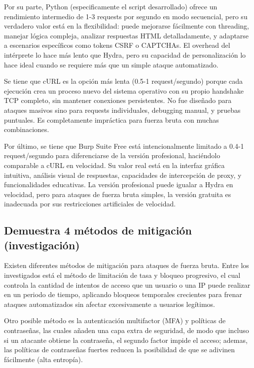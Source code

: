 \documentclass[letter,12pt]{article}
\begin{document}
Por su parte, Python (especificamente el script desarrollado) ofrece un rendimiento intermedio de 1-3 requests por segundo en modo secuencial, pero su verdadero valor está en la flexibilidad: puede mejorarse fácilmente con threading, manejar lógica compleja, analizar respuestas HTML detalladamente, y adaptarse a escenarios específicos como tokens CSRF o CAPTCHAs. El overhead del intérprete lo hace más lento que Hydra, pero su capacidad de personalización lo hace ideal cuando se requiere más que un simple ataque automatizado.

Se tiene que cURL es la opción más lenta (0.5-1 request/segundo) porque cada ejecución crea un proceso nuevo del sistema operativo con su propio handshake TCP completo, sin mantener conexiones persistentes. No fue diseñado para ataques masivos sino para requests individuales, debugging manual, y pruebas puntuales. Es completamente impráctica para fuerza bruta con muchas combinaciones.

Por último, se tiene que Burp Suite Free está intencionalmente limitado a 0.4-1 request/segundo para diferenciarse de la versión profesional, haciéndolo comparable a cURL en velocidad. Su valor real está en la interfaz gráfica intuitiva, análisis visual de respuestas, capacidades de intercepción de proxy, y funcionalidades educativas. La versión profesional puede igualar a Hydra en velocidad, pero para ataques de fuerza bruta simples, la versión gratuita es inadecuada por sus restricciones artificiales de velocidad.

\newpage

\subsection{Demuestra 4 métodos de mitigación (investigación)}
Existen diferentes métodos de mitigación para ataques de fuerza bruta. Entre los investigados está el método de limitación de tasa y bloqueo progresivo, el cual controla la cantidad de intentos de acceso que un usuario o una IP puede realizar en un periodo de tiempo, aplicando bloqueos temporales crecientes para frenar ataques automatizados sin afectar excesivamente a usuarios legítimos. 

Otro posible método es la autenticación multifactor (MFA) y políticas de contraseñas, las cuales añaden una capa extra de seguridad, de modo que incluso si un atacante obtiene la contraseña, el segundo factor impide el acceso; ademas, las políticas de contraseñas fuertes reducen la posibilidad de que se adivinen fácilmente (alta entropía). 
\end{document}
